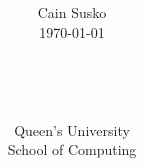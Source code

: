 \documentclass[12pt]{book}
\newcommand{\classID}{}
\newcommand{\coursename}{}
\begin{document}
\date{}
\setlength{\parindent}{0em}  %

\title{\coursename\\\classID}

\author{\\ \\ Cain Susko\\\today \\ \\ \\ \\ \\
        Queen's University \\School of Computing} 
 

\maketitle
\pagebreak

\section*{}
\end{document}
